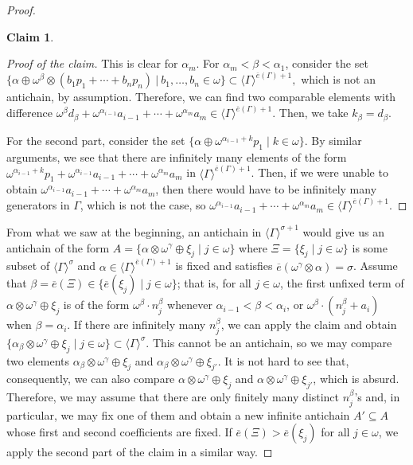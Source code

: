 \documentclass[10pt,a4paper]{amsart}
\newtheorem{claim}{Claim}
\begin{document}
\begin{proof}
\begin{claim}
\end{claim}
\begin{proof}[Proof of the claim] This is clear for $\alpha_m$. For $\alpha_m<\beta<\alpha_1$, consider the set $ \{\alpha\oplus\omega^{\beta}\otimes(b_1p_1+\cdots+b_np_n) \ |\ b_1,\dots,b_n\in\omega\}\subset\langle\Gamma \rangle^{\overline{e}(\Gamma)+1},$ which is not an antichain, by assumption. Therefore, we can find two comparable elements with difference $\omega^{\beta}d_\beta+\omega^{\alpha_{i-1}} a_{i-1} + \cdots + \omega^{\alpha_m} a_m\in\langle\Gamma \rangle^{\overline{e}(\Gamma)+1}$. Then, we take $k_{\beta} = d_\beta$.

For the second part, consider the set $\{\alpha \oplus \omega^{\alpha_{i-1}+k} p_1 \mid k \in \omega\}$. By similar arguments, we see that there are infinitely many elements of the form $\omega^{\alpha_{i-1}+k} p_1+ \omega^{\alpha_{i-1}} a_{i-1}+ \cdots + \omega^{\alpha_m} a_m $ in $\langle \Gamma \rangle^{\overline{e}(\Gamma)+1}$. Then, if we were unable to obtain $\omega^{\alpha_{i-1}} a_{i-1} + \cdots + \omega^{\alpha_m} a_m$, then there would have to be infinitely many generators in $\Gamma$, which is not the case, so $\omega^{\alpha_{i-1}} a_{i-1} + \cdots + \omega^{\alpha_m} a_m\in \langle \Gamma \rangle^{\overline{e}(\Gamma)+1}$.
\end{proof}
    From what we saw at the beginning, an antichain in $\langle\Gamma\rangle^{\sigma+1}$ would give us an antichain of the form $A=\{\alpha \otimes \omega^{\gamma} \oplus \xi_j \mid j \in \omega\}$ where $\Xi=\{\xi_j \mid j\in\omega\}$ is some subset of $\langle \Gamma \rangle^{\sigma } $ and $\alpha\in\langle \Gamma \rangle^{\overline{e}(\Gamma)+1}$ is fixed and satisfies $ \overline{e}(\omega^\gamma\otimes\alpha)=\sigma$. Assume that $\beta=\overline{e}(\Xi)\in\{\overline{e}(\xi_j)\mid j\in\omega\}$; that is,  for all $j\in\omega$, the first unfixed term of $\alpha \otimes \omega^{\gamma} \oplus \xi_j$ is of the form $\omega^\beta \cdot n_j^\beta$ whenever $\alpha_{i-1} < \beta < \alpha_i$, or $\omega^\beta \cdot (n_j^\beta + a_i)$ when $\beta = \alpha_i$. If there are infinitely many $n_j^\beta$, we can apply the claim and obtain $\{\alpha_\beta \otimes \omega^{\gamma} \oplus \xi_j \mid j \in \omega\}\subset\langle\Gamma\rangle^\sigma$. This cannot be an antichain, so we may compare two elements $\alpha_\beta \otimes \omega^{\gamma} \oplus \xi_j$ and $\alpha_\beta \otimes \omega^{\gamma} \oplus \xi_{j'}$. It is not hard to see that, consequently, we can also compare $\alpha \otimes \omega^{\gamma} \oplus \xi_j$ and $\alpha \otimes \omega^{\gamma} \oplus \xi_{j'}$, which is absurd. Therefore, we may assume that there are only finitely many distinct $n_j^\beta$’s and, in particular, we may fix one of them and obtain a new infinite antichain $A' \subseteq A$ whose first and second coefficients are fixed. If $\overline{e}(\Xi)>\overline{e}(\xi_j)$ for all $j\in\omega$, we apply the second part of the claim in a similar way.
    

\end{proof}
\end{document}

